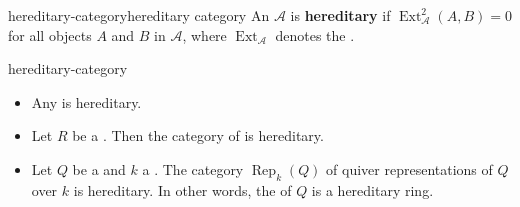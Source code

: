 \begin{topic}{hereditary-category}{hereditary category}
    An  $\mathcal{A}$ is \textbf{hereditary} if $\operatorname{Ext}_\mathcal{A}^2(A, B) = 0$ for all objects $A$ and $B$ in $\mathcal{A}$, where $\operatorname{Ext}_\mathcal{A}$ denotes the .
\end{topic}

\begin{example}{hereditary-category}
    \begin{itemize}
        \item Any  is hereditary.
        \item Let $R$ be a . Then the category of  is hereditary.
        \item Let $Q$ be a  and $k$ a . The category $\operatorname{Rep}_k(Q)$ of quiver representations of $Q$ over $k$ is hereditary. In other words, the  of $Q$ is a hereditary ring.
    \end{itemize}
\end{example}
